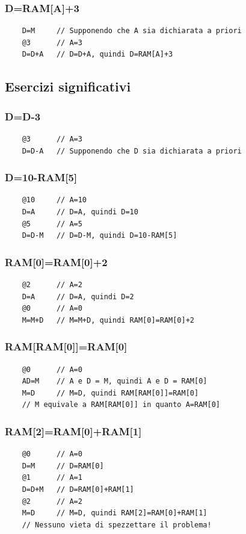 \documentclass[12pt]{article}
\begin{document}
\subsubsection{D=RAM[A]+3}
\begin{lstlisting}
    D=M     // Supponendo che A sia dichiarata a priori
    @3      // A=3
    D=D+A   // D=D+A, quindi D=RAM[A]+3
\end{lstlisting}

\subsection{Esercizi significativi}

\subsubsection{D=D-3}
\begin{lstlisting}
    @3      // A=3
    D=D-A   // Supponendo che D sia dichiarata a priori
\end{lstlisting}

\subsubsection{D=10-RAM[5]}
\begin{lstlisting}
    @10     // A=10
    D=A     // D=A, quindi D=10
    @5      // A=5
    D=D-M   // D=D-M, quindi D=10-RAM[5]
\end{lstlisting}

\subsubsection{RAM[0]=RAM[0]+2}
\begin{lstlisting}
    @2      // A=2
    D=A     // D=A, quindi D=2
    @0      // A=0
    M=M+D   // M=M+D, quindi RAM[0]=RAM[0]+2
\end{lstlisting}

\subsubsection{RAM[RAM[0]]=RAM[0]}
\begin{lstlisting}
    @0      // A=0
    AD=M    // A e D = M, quindi A e D = RAM[0]
    M=D     // M=D, quindi RAM[RAM[0]]=RAM[0]
    // M equivale a RAM[RAM[0]] in quanto A=RAM[0]
\end{lstlisting}

\subsubsection{RAM[2]=RAM[0]+RAM[1]}
\begin{lstlisting}
    @0      // A=0
    D=M     // D=RAM[0]
    @1      // A=1
    D=D+M   // D=RAM[0]+RAM[1]
    @2      // A=2
    M=D     // M=D, quindi RAM[2]=RAM[0]+RAM[1]
    // Nessuno vieta di spezzettare il problema!
\end{lstlisting}
\end{document}

